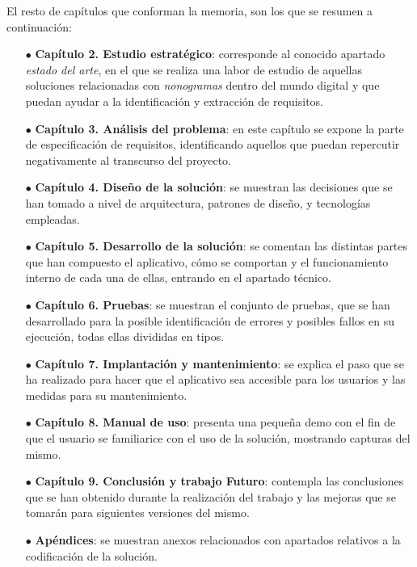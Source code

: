 El resto de capítulos que conforman la memoria, son los que se resumen a continuación:

\begin{itemize}
   \item[$\bullet$] \textbf{Capítulo 2. Estudio estratégico}: corresponde al conocido apartado \textit{estado del arte}, en el que se realiza una labor 
   de estudio de aquellas soluciones relacionadas con \textit{nonogramas} dentro del mundo digital y que puedan ayudar a la identificación y extracción de requisitos.
   \item[$\bullet$] \textbf{Capítulo 3. Análisis del problema}: en este capítulo se expone la parte de especificación de requisitos,
    identificando aquellos que puedan repercutir negativamente al transcurso del proyecto.
   \item[$\bullet$] \textbf{Capítulo 4. Diseño de la solución}: se muestran las decisiones que se han tomado a nivel de arquitectura, patrones de diseño, 
   y tecnologías empleadas.
   \item[$\bullet$] \textbf{Capítulo 5. Desarrollo de la solución}: se comentan las distintas partes que han compuesto el aplicativo, cómo se comportan y 
   el funcionamiento interno de cada una de ellas, entrando en el apartado técnico.
   \item[$\bullet$] \textbf{Capítulo 6. Pruebas}: se muestran el conjunto de pruebas, que se han desarrollado para la posible identificación de 
   errores y posibles fallos en su ejecución, todas ellas divididas en tipos. 
   \item[$\bullet$] \textbf{Capítulo 7. Implantación y mantenimiento}: se explica el paso que se ha realizado para hacer que el aplicativo sea accesible
   para los usuarios y las medidas para su mantenimiento. 
   \item[$\bullet$] \textbf{Capítulo 8. Manual de uso}: presenta una pequeña demo con el fin de que el usuario se familiarice con el uso de
   la solución, mostrando capturas del mismo.
   \item[$\bullet$] \textbf{Capítulo 9. Conclusión y trabajo Futuro}: contempla las conclusiones que se han obtenido durante la realización del trabajo y
   las mejoras que se tomarán para siguientes versiones del mismo.
   \item[$\bullet$] \textbf{Apéndices}: se muestran anexos relacionados con apartados relativos a la codificación de
   la solución.
\end{itemize}